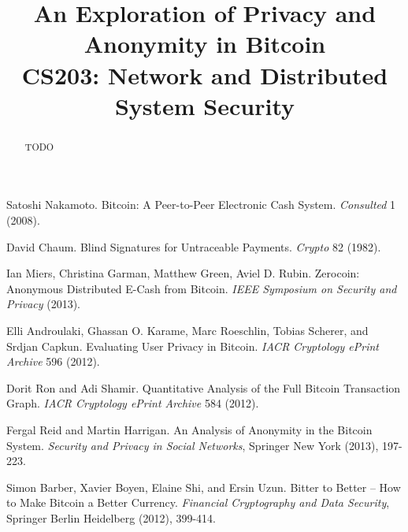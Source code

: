 \documentclass[conference]{IEEEtran}
\begin{document}
\title{An Exploration of Privacy and Anonymity in Bitcoin \\ {\LARGE CS203: Network and Distributed System Security}}


\author{
\and
{}
}

\maketitle

\begin{abstract}
TODO
\end{abstract}

\IEEEpeerreviewmaketitle









\begin{thebibliography}{1}

 Satoshi Nakamoto. Bitcoin: A Peer-to-Peer Electronic Cash System. \emph{Consulted} 1 (2008).

 David Chaum. Blind Signatures for Untraceable Payments. \emph{Crypto} 82 (1982).

 Ian Miers, Christina Garman, Matthew Green, Aviel D. Rubin. Zerocoin: Anonymous Distributed E-Cash from Bitcoin. \emph{IEEE Symposium on Security and Privacy} (2013).

 Elli Androulaki, Ghassan O. Karame, Marc Roeschlin, Tobias Scherer, and Srdjan Capkun. Evaluating User Privacy in Bitcoin. \emph{IACR Cryptology ePrint Archive} 596 (2012).

 Dorit Ron and Adi Shamir. Quantitative Analysis of the Full Bitcoin Transaction Graph. \emph{IACR Cryptology ePrint Archive} 584 (2012).

 Fergal Reid and Martin Harrigan. An Analysis of Anonymity in the Bitcoin System. \emph{Security and Privacy in Social Networks}, Springer New York (2013), 197-223.

 Simon Barber, Xavier Boyen, Elaine Shi, and Ersin Uzun. Bitter to Better -- How to Make Bitcoin a Better Currency. \emph{Financial Cryptography and Data Security}, Springer Berlin Heidelberg (2012), 399-414.



\end{thebibliography}




\end{document}
